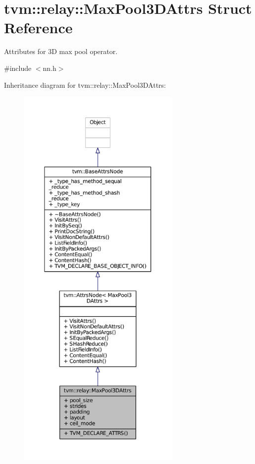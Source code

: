 \hypertarget{structtvm_1_1relay_1_1MaxPool3DAttrs}{}\section{tvm\+:\+:relay\+:\+:Max\+Pool3\+D\+Attrs Struct Reference}
\label{structtvm_1_1relay_1_1MaxPool3DAttrs}


Attributes for 3D max pool operator.  




{\ttfamily \#include $<$nn.\+h$>$}



Inheritance diagram for tvm\+:\+:relay\+:\+:Max\+Pool3\+D\+Attrs\+:
\nopagebreak
\begin{figure}[H]
\begin{center}
\leavevmode
\includegraphics[height=550pt]{structtvm_1_1relay_1_1MaxPool3DAttrs__inherit__graph}
\end{center}
\end{figure}


